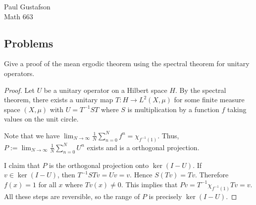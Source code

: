 \documentclass{article}
\begin{document}
\noindent Paul Gustafson\\
\noindent Math 663 


\subsection*{Problems}
 Give a proof of the mean ergodic theorem using the spectral theorem for unitary operators.
\begin{proof}
Let $U$ be a unitary operator on a Hilbert space $H$. By the spectral theorem, there exists a unitary map $T: H \to L^2(X, \mu)$ for some finite measure space $(X, \mu)$ with $U = T^{-1}ST$ where $S$ is multiplication by a function $f$ taking values on the unit circle.

Note that we have $\lim_{N \to \infty} \frac 1 N \sum_{n=0}^N f^n = \chi_{f^{-1}(1)}$. Thus, $P := \lim_{N \to \infty} \frac 1 N \sum_{n=0}^N U^n$ exists and is a orthogonal projection. 

I claim that $P$ is the orthogonal projection onto $\ker(I - U)$. If $v \in \ker(I - U)$, then $T^{-1}STv = Uv = v$. Hence $S(Tv) = Tv$. Therefore $f(x) = 1$ for all $x$ where $Tv(x) \neq 0$. This implies that $Pv = T^{-1} \chi_{f^{-1}(1)} Tv = v$. All these steps are reversible, so the range of $P$ is precisely $\ker(I-U)$.
\end{proof}
\end{document}
